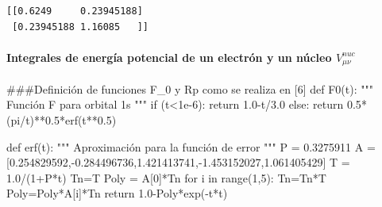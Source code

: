 \documentclass[
  letterpaper,
  DIV=11,
  numbers=noendperiod]{scrreprt}
\let\oldparagraph\paragraph
\renewcommand{\paragraph}[1]{\oldparagraph{#1}\mbox{}}
\newenvironment{Shaded}{\begin{snugshade}}{\end{snugshade}}
\newcommand{\BuiltInTok}[1]{\textcolor[rgb]{0.00,0.23,0.31}{#1}}
\newcommand{\CommentTok}[1]{\textcolor[rgb]{0.37,0.37,0.37}{#1}}
\newcommand{\ControlFlowTok}[1]{\textcolor[rgb]{0.00,0.23,0.31}{#1}}
\newcommand{\DecValTok}[1]{\textcolor[rgb]{0.68,0.00,0.00}{#1}}
\newcommand{\FloatTok}[1]{\textcolor[rgb]{0.68,0.00,0.00}{#1}}
\newcommand{\KeywordTok}[1]{\textcolor[rgb]{0.00,0.23,0.31}{#1}}
\newcommand{\NormalTok}[1]{\textcolor[rgb]{0.00,0.23,0.31}{#1}}
\newcommand{\OperatorTok}[1]{\textcolor[rgb]{0.37,0.37,0.37}{#1}}
\begin{document}
\begin{verbatim}
[[0.6249     0.23945188]
 [0.23945188 1.16085   ]]
\end{verbatim}

\hypertarget{integrales-de-energuxeda-potencial-de-un-electruxf3n-y-un-nuxfacleo-vnuc_mu-nu}{%
\paragraph{\texorpdfstring{Integrales de energía potencial de un
electrón y un núcleo
\(V^{nuc}_{\mu \nu}\)}{Integrales de energía potencial de un electrón y un núcleo V\^{}\{nuc\}\_\{\textbackslash mu \textbackslash nu\}}}\label{integrales-de-energuxeda-potencial-de-un-electruxf3n-y-un-nuxfacleo-vnuc_mu-nu}}

\begin{Shaded}
\begin{Highlighting}[]
\CommentTok{\#\#\#Definición de funciones F\_0 y Rp como se realiza en [6]}
\KeywordTok{def}\NormalTok{ F0(t):}
    \CommentTok{"""}
\CommentTok{    Función F para orbital 1s}
\CommentTok{    """}
    \ControlFlowTok{if}\NormalTok{ (t}\OperatorTok{\textless{}}\FloatTok{1e{-}6}\NormalTok{):}
        \ControlFlowTok{return} \FloatTok{1.0}\OperatorTok{{-}}\NormalTok{t}\OperatorTok{/}\FloatTok{3.0}
    \ControlFlowTok{else}\NormalTok{:}
        \ControlFlowTok{return} \FloatTok{0.5}\OperatorTok{*}\NormalTok{(pi}\OperatorTok{/}\NormalTok{t)}\OperatorTok{**}\FloatTok{0.5}\OperatorTok{*}\NormalTok{erf(t}\OperatorTok{**}\FloatTok{0.5}\NormalTok{)}
    
\KeywordTok{def}\NormalTok{ erf(t):}
    \CommentTok{"""}
\CommentTok{    Aproximación para la función de error}
\CommentTok{    """}
\NormalTok{    P }\OperatorTok{=} \FloatTok{0.3275911}
\NormalTok{    A }\OperatorTok{=}\NormalTok{ [}\FloatTok{0.254829592}\NormalTok{,}\OperatorTok{{-}}\FloatTok{0.284496736}\NormalTok{,}\FloatTok{1.421413741}\NormalTok{,}\OperatorTok{{-}}\FloatTok{1.453152027}\NormalTok{,}\FloatTok{1.061405429}\NormalTok{]}
\NormalTok{    T }\OperatorTok{=} \FloatTok{1.0}\OperatorTok{/}\NormalTok{(}\DecValTok{1}\OperatorTok{+}\NormalTok{P}\OperatorTok{*}\NormalTok{t)}
\NormalTok{    Tn}\OperatorTok{=}\NormalTok{T}
\NormalTok{    Poly }\OperatorTok{=}\NormalTok{ A[}\DecValTok{0}\NormalTok{]}\OperatorTok{*}\NormalTok{Tn}
    \ControlFlowTok{for}\NormalTok{ i }\KeywordTok{in} \BuiltInTok{range}\NormalTok{(}\DecValTok{1}\NormalTok{,}\DecValTok{5}\NormalTok{):}
\NormalTok{        Tn}\OperatorTok{=}\NormalTok{Tn}\OperatorTok{*}\NormalTok{T}
\NormalTok{        Poly}\OperatorTok{=}\NormalTok{Poly}\OperatorTok{*}\NormalTok{A[i]}\OperatorTok{*}\NormalTok{Tn}
    \ControlFlowTok{return} \FloatTok{1.0}\OperatorTok{{-}}\NormalTok{Poly}\OperatorTok{*}\NormalTok{exp(}\OperatorTok{{-}}\NormalTok{t}\OperatorTok{*}\NormalTok{t)}
\end{Highlighting}
\end{Shaded}
\end{document}
